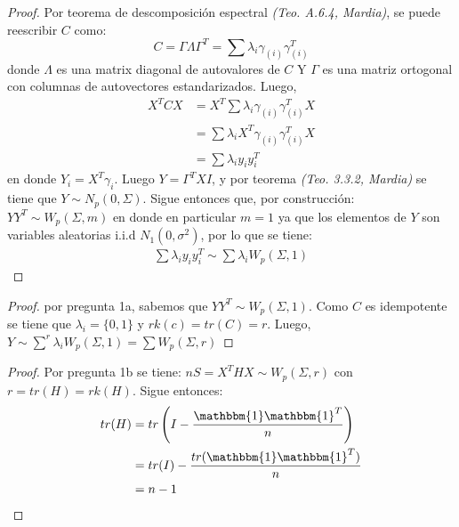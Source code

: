 \begin{solution}
\begin{proof}
Por teorema de descomposición espectral \textit{(Teo. A.6.4, Mardia)}, se puede reescribir $C$ como:
$$C=\Gamma \Lambda \Gamma^{T}=\sum \lambda_i \gamma_{(i)} \gamma_{(i)}^{T}$$
donde $\Lambda$ es una matrix diagonal de autovalores de $C$ Y $\Gamma$ es una matriz ortogonal con columnas de autovectores estandarizados. Luego,
\begin{align*}
X^{T}CX &=X^T \sum \lambda_i \gamma_{(i)} \gamma_{(i)}^{T} X\\
&= \sum \lambda_i X^T \gamma_{(i)} \gamma_{(i)}^{T} X\\
&= \sum \lambda_i y_i y_{i}^{T}
\end{align*}
en donde $Y_i=X^T \gamma_i$. Luego $Y=\Gamma^{T} X I$, y por teorema \textit{(Teo. 3.3.2, Mardia)} se tiene que $Y\sim N_p(0,\Sigma)$. Sigue entonces que, por construcción: $Y Y^T\sim W_p(\Sigma,m)$ en donde en particular $m=1$ ya que los elementos de $Y$ son variables aleatorias i.i.d $N_1(0,\sigma^2)$, por lo que se tiene:
\begin{align*}
\sum \lambda_i y_i y_{i}^{T} \sim \sum \lambda_i W_p(\Sigma,1)
\end{align*}
\end{proof}

\begin{proof}
por pregunta 1a, sabemos que $YY^T \sim  W_p(\Sigma,1)$. Como $C$ es idempotente se tiene que $\lambda_i=\{0,1\}$ y $rk(c)=tr(C)=r$. Luego, $\displaystyle Y\sim \sum^{r} \lambda_i W_p(\Sigma,1)=\sum W_p(\Sigma,r)$
\end{proof}

\begin{proof}
Por pregunta 1b se tiene:
$nS= X^T H X \sim W_p(\Sigma,r)$ con $r=tr(H)=rk(H)$. Sigue entonces:
\begin{align*}
tr(H)&=tr \left( I - \dfrac{\mathbbm{1} \mathbbm{1}^T}{n} \right)\\
&= tr(I) - \dfrac{tr(\mathbbm{1} \mathbbm{1}^T)}{n}\\
&= n - 1
\end{align*}
\end{proof}
\end{solution}
